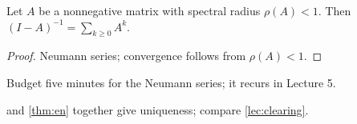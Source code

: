 
\begin{proposition}\label{prop:asym}
    Let \(A\) be a nonnegative matrix with spectral radius \(\rho(A)<1\). Then
    \((I-A)^{-1}=\sum_{k\ge0}A^k\).
\end{proposition}
\begin{proof}
    Neumann series; convergence follows from \(\rho(A)<1\). \qedhere
\end{proof}

\begin{teachnote}
    Budget five minutes for the Neumann series; it recurs in Lecture 5.
\end{teachnote}

\begin{remark}
     and \cref{thm:en} together give uniqueness; compare
    \cref{lec:clearing}.
\end{remark}